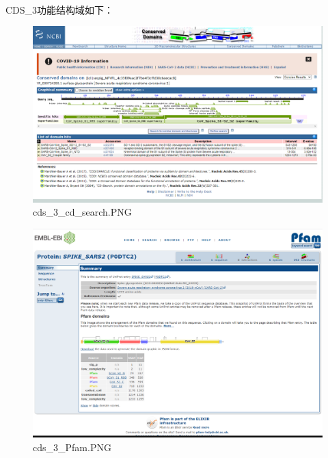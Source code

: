 \documentclass[supercite]{HustGraduPaper}
\begin{document}
	\paragraph{}\label{subpara:subpara}CDS\_3功能结构域如下：
	\begin{figure}[H]
		\centering
		\includegraphics[width=1\textwidth]{./material/practice2/cds_3/cd_search.png}
		\caption{cds\_3\_cd\_search.PNG}
	\end{figure}
	\begin{figure}[H]
		\centering
		\includegraphics[width=1\textwidth]{./material/practice2/cds_3/Pfam.png}
		\caption{cds\_3\_Pfam.PNG}
	\end{figure}
\end{document}
